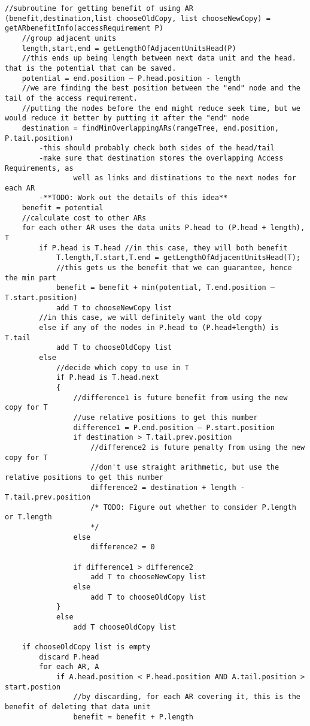 \documentclass[11pt,psfig]{article}
\begin{document}
\begin{verbatim}
//subroutine for getting benefit of using AR
(benefit,destination,list chooseOldCopy, list chooseNewCopy) = getARbenefitInfo(accessRequirement P)
	//group adjacent units
	length,start,end = getLengthOfAdjacentUnitsHead(P)
	//this ends up being length between next data unit and the head. that is the potential that can be saved.
	potential = end.position – P.head.position - length
	//we are finding the best position between the "end" node and the tail of the access requirement.
	//putting the nodes before the end might reduce seek time, but we would reduce it better by putting it after the "end" node
	destination = findMinOverlappingARs(rangeTree, end.position, P.tail.position)
		-this should probably check both sides of the head/tail
		-make sure that destination stores the overlapping Access Requirements, as
				well as links and distinations to the next nodes for each AR
		-**TODO: Work out the details of this idea**
	benefit = potential
	//calculate cost to other ARs
	for each other AR uses the data units P.head to (P.head + length), T
		if P.head is T.head //in this case, they will both benefit
			T.length,T.start,T.end = getLengthOfAdjacentUnitsHead(T);
			//this gets us the benefit that we can guarantee, hence the min part
			benefit = benefit + min(potential, T.end.position – T.start.position)
			add T to chooseNewCopy list
		//in this case, we will definitely want the old copy
		else if any of the nodes in P.head to (P.head+length) is T.tail
			add T to chooseOldCopy list
		else
			//decide which copy to use in T
			if P.head is T.head.next
			{
				//difference1 is future benefit from using the new copy for T
				//use relative positions to get this number
				difference1 = P.end.position – P.start.position
				if destination > T.tail.prev.position
					//difference2 is future penalty from using the new copy for T
					//don't use straight arithmetic, but use the relative positions to get this number
					difference2 = destination + length - T.tail.prev.position
					/* TODO: Figure out whether to consider P.length or T.length
					*/
				else
					difference2 = 0
				
				if difference1 > difference2
					add T to chooseNewCopy list
				else
					add T to chooseOldCopy list
			}
			else
				add T chooseOldCopy list
			
	if chooseOldCopy list is empty
		discard P.head
		for each AR, A
			if A.head.position < P.head.position AND A.tail.position > start.postion
				//by discarding, for each AR covering it, this is the benefit of deleting that data unit
				benefit = benefit + P.length

\end{verbatim}
\end{document}
